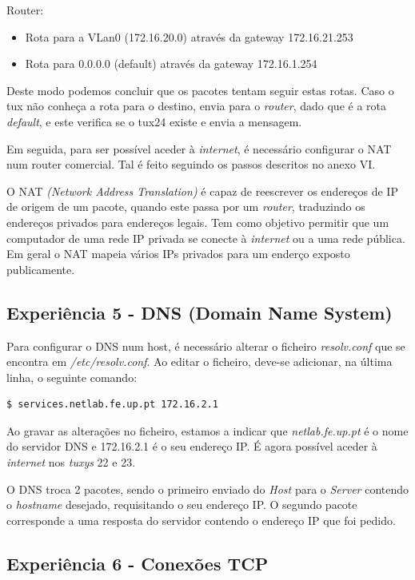 \documentclass[11pt]{article}
\begin{document}
Router:
\begin{itemize}
\item Rota para a VLan0 (172.16.20.0) através da gateway 172.16.21.253
\item Rota para 0.0.0.0 (default) através da gateway 172.16.1.254
\end{itemize}

Deste modo podemos concluir que os pacotes tentam seguir estas rotas. Caso o tux não conheça a rota para o destino, envia para o \textit{router}, dado que é a rota \textit{default}, e este verifica se o tux24 existe e envia a mensagem. 

Em seguida, para ser possível aceder à \textit{internet}, é necessário configurar o NAT num router comercial. Tal é feito seguindo os passos descritos no anexo VI.

O NAT \emph{(Network Address Translation)} é capaz de reescrever os endereços de IP de origem de um pacote, quando este passa por um \textit{router}, traduzindo os endereços privados para endereços legais. Tem como objetivo permitir que um computador de uma rede IP privada se conecte à \textit{internet} ou a uma rede pública. Em geral o NAT mapeia vários IPs privados para um enderço exposto publicamente.

\subsection{Experiência 5 - DNS (Domain Name System)}

Para configurar o DNS num host, é necessário alterar o ficheiro \textit{resolv.conf} que se encontra em \textit{/etc/resolv.conf}. Ao editar o ficheiro, deve-se adicionar, na última linha, o seguinte comando:

\begin{lstlisting}[language=bash]
    $ services.netlab.fe.up.pt 172.16.2.1
\end{lstlisting}

Ao gravar as alterações no ficheiro, estamos a indicar que \textit{netlab.fe.up.pt} é o nome do servidor DNS e 172.16.2.1 é o seu endereço IP. É agora possível aceder à \textit{internet} nos \textit{tuxys} 22 e 23.

O DNS troca 2 pacotes, sendo o primeiro enviado do \textit{Host} para o \textit{Server} contendo o \textit{hostname} desejado, requisitando o seu endereço IP. O segundo pacote corresponde a uma resposta do servidor contendo o endereço IP que foi pedido.

\subsection{Experiência 6 - Conexões TCP}
\end{document}
